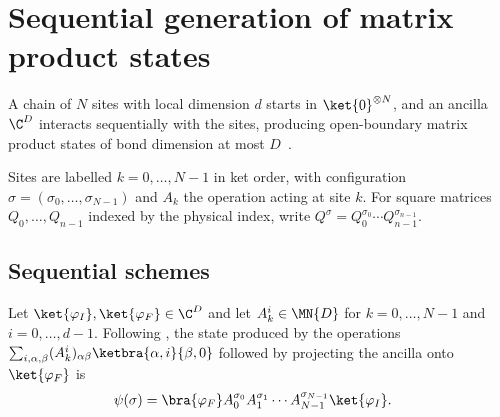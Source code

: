 
\chapter{Sequential generation of matrix product states}\label{ch:seqanc}

A chain of $N$ sites with local dimension $d$ starts in $\ket{0}^{\otimes N}$,
and an ancilla $\C^D$ interacts sequentially with the sites, producing
open-boundary matrix product states of bond dimension at most
$D$~\cite[Section~5.1]{PerezGarcia2007Matrix}.

Sites are labelled $k=0,\dots,N-1$ in ket order, with configuration
$\sigma=(\sigma_0,\dots,\sigma_{N-1})$ and $A_k$ the operation acting at site
$k$. For square matrices $Q_0,\dots,Q_{n-1}$ indexed by the physical index,
write $Q^\sigma=Q_0^{\sigma_0}\cdots Q_{n-1}^{\sigma_{n-1}}$.

\section{Sequential schemes}

\begin{definition}
    \label{def:seqanc_state}
    \leanok
    Let $\ket{\varphi_I},\ket{\varphi_F}\in\C^D$ and let
    $A_k^i\in\MN{D}$ for $k=0,\dots,N-1$ and $i=0,\dots,d-1$. Following
    \cite[Section~5.1]{PerezGarcia2007Matrix}, the state produced by the
    operations
    $\sum_{i,\alpha,\beta}(A_k^i)_{\alpha\beta}\ketbra{\alpha,i}{\beta,0}$
    followed by projecting the ancilla onto $\ket{\varphi_F}$ is
    \begin{align}
        \psi(\sigma)
         & =\bra{\varphi_F}A_0^{\sigma_0}A_1^{\sigma_1}\cdots
        A_{N-1}^{\sigma_{N-1}}\ket{\varphi_I}.
        \label{eq:seqanc_state}
    \end{align}
\end{definition}

